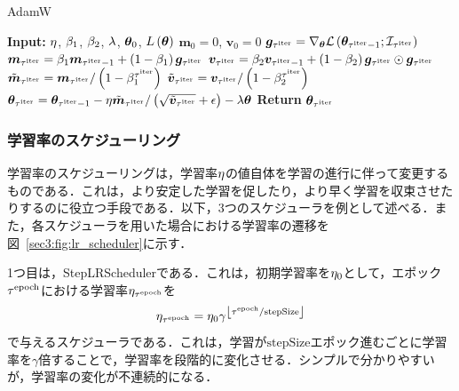 \begin{algorithm}
    \caption{AdamW}
    \label{sec3:algo:adamw}
    \begin{algorithmic}[1]
        \State \textbf{Input:} $\eta$, $\beta_{1}$, $\beta_{2}$, $\lambda$, $\bm{\theta}_{0}$, $L\left(\bm{\theta}\right)$
        \State $\bm{m}_{0} = 0$, $\bm{v}_{0} = 0$
        \State $\bm{g}_{\tau^{\text{iter}}} = \nabla_{\bm{\theta}} \mathcal{L}\left(\bm{\theta}_{\tau^{\text{iter}} - 1}; \mathcal{I}_{\tau^{\text{iter}}}\right)$
        \State $\bm{m}_{\tau^{\text{iter}}} = \beta_{1} \bm{m}_{\tau^{\text{iter}} - 1} + \left(1 - \beta_{1}\right) \bm{g}_{\tau^{\text{iter}}}$
        \State $\bm{v}_{\tau^{\text{iter}}} = \beta_{2} \bm{v}_{\tau^{\text{iter}} - 1} + \left(1 - \beta_{2}\right) \bm{g}_{\tau^{\text{iter}}} \odot \bm{g}_{\tau^{\text{iter}}}$
        \State $\tilde{\bm{m}}_{\tau^{\text{iter}}} = \bm{m}_{\tau^{\text{iter}}} / \left(1 - \beta_{1}^{\tau^{\text{iter}}}\right)$
        \State $\tilde{\bm{v}}_{\tau^{\text{iter}}} = \bm{v}_{\tau^{\text{iter}}} / \left(1 - \beta_{2}^{\tau^{\text{iter}}}\right)$
        \State $\bm{\theta}_{\tau^{\text{iter}}} = \bm{\theta}_{\tau^{\text{iter}} - 1} - \eta \tilde{\bm{m}}_{\tau^{\text{iter}}} / \left(\sqrt{\tilde{\bm{v}}_{\tau^{\text{iter}}}} + \epsilon\right) - \lambda \bm{\theta}$
        \EndFor
        \State \textbf{Return} $\bm{\theta}_{\tau^{\text{iter}}}$
    \end{algorithmic}
\end{algorithm}

\subsubsection{学習率のスケジューリング}
学習率のスケジューリングは，学習率$\eta$の値自体を学習の進行に伴って変更するものである．これは，より安定した学習を促したり，より早く学習を収束させたりするのに役立つ手段である．以下，3つのスケジューラを例として述べる．また，各スケジューラを用いた場合における学習率の遷移を図~\ref{sec3:fig:lr_scheduler}に示す．

1つ目は，StepLRSchedulerである．これは，初期学習率を$\eta_{0}$として，エポック$\tau^{\text{epoch}}$における学習率$\eta_{\tau^{\text{epoch}}}$を
\begin{equation}
    \eta_{\tau^{\text{epoch}}} = \eta_{0} \gamma^{\left\lfloor \tau^{\text{epoch}} / \text{stepSize} \right\rfloor}
\end{equation}
で与えるスケジューラである．これは，学習が$\text{stepSize}$エポック進むごとに学習率を$\gamma$倍することで，学習率を段階的に変化させる．シンプルで分かりやすいが，学習率の変化が不連続的になる．

